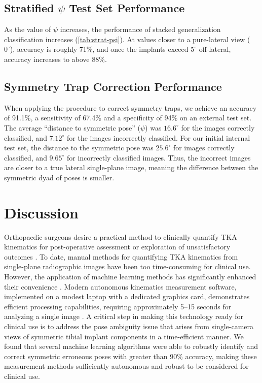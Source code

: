 {\subsection{Stratified \texorpdfstring{$\psi$}{ψ} Test Set Performance}
As the value of $\psi$ increases, the performance of stacked generalization classification increases (\cref{tab:strat-psi}).
At values closer to a pure-lateral view (~$0^{\circ}$), accuracy is roughly 71\%, and once the implants exceed $5^{\circ}$ off-lateral, accuracy increases to above 88\%.



\subsection{Symmetry Trap Correction Performance}
When applying the procedure to correct symmetry traps, we achieve an accuracy of
91.1\%, a sensitivity of 67.4\% and a specificity of 94\% on an external test
set. The average “distance to symmetric pose” ($\psi$) was $16.6^{\circ}$ for
the images correctly classified, and $7.12^{\circ}$ for the images incorrectly
classified. For our initial internal test set, the distance to the symmetric
pose was $25.6^{\circ}$ for images correctly classified, and $9.65^{\circ}$ for
incorrectly classified images. Thus, the incorrect images are closer to a true
lateral single-plane image, meaning the difference between the symmetric dyad of
poses is smaller.

\section{Discussion}
Orthopaedic surgeons desire a practical method to clinically quantify TKA
kinematics for post-operative assessment or exploration of unsatisfactory
outcomes \cite{banksWhatPostoperativeOutcome2017}. To date, manual methods for
quantifying TKA kinematics from single-plane radiographic images have been too
time-consuming for clinical use. However, the application of machine learning
methods has significantly enhanced their convenience
\cite{jensenJointTrackMachine2023}. Modern autonomous kinematics measurement
software, implemented on a modest laptop with a dedicated graphics card,
demonstrates efficient processing capabilities, requiring approximately 5–15
seconds for analyzing a single image \cite{jensenJointTrackMachine2023}. A
critical step in making this technology ready for clinical use is to address the
pose ambiguity issue that arises from single-camera views of symmetric tibial
implant components in a time-efficient manner. We found that several machine
learning algorithms were able to robustly identify and correct symmetric
erroneous poses with greater than 90\% accuracy, making these measurement
methods sufficiently autonomous and robust to be considered for clinical use.

}
